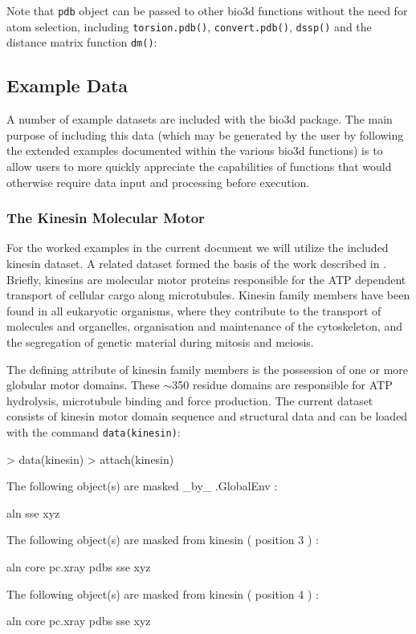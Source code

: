 \documentclass[a4paper]{article}
\begin{document}
Note that \texttt{pdb} object can be passed to other bio3d functions without the need for atom selection, including \texttt{torsion.pdb()}, \texttt{convert.pdb()}, \texttt{dssp()} and the distance matrix function \texttt{dm()}:

\subsection{Example Data}
A number of example datasets are included with the bio3d package. The main purpose of including this data (which may be generated by the user by following the extended examples documented within the various bio3d functions) is to allow users to more quickly appreciate the capabilities of functions that would otherwise require data input and processing before execution.


\subsubsection{The Kinesin Molecular Motor}
For the worked examples in the current document we will utilize the included kinesin dataset.  A related dataset formed the basis of the work described in \citep{grant07}.  Briefly, kinesins are molecular motor proteins responsible for the ATP dependent transport of cellular cargo along microtubules.  Kinesin family members have been found in all eukaryotic organisms, where they contribute to the transport of molecules and organelles, organisation and maintenance of the cytoskeleton, and the segregation of genetic material during mitosis and meiosis. 

The defining attribute of kinesin family members is the possession of one or more globular motor domains. These $\sim$350 residue domains are responsible for ATP hydrolysis, microtubule binding and force production. The current dataset consists of kinesin motor domain sequence and structural data and can be loaded with the command \texttt{data(kinesin)}:

\begin{Schunk}
\begin{Sinput}
> data(kinesin)
> attach(kinesin)
\end{Sinput}
\begin{Soutput}
	The following object(s) are masked _by_ .GlobalEnv :

	 aln sse xyz 


	The following object(s) are masked from kinesin ( position 3 ) :

	 aln core pc.xray pdbs sse xyz 


	The following object(s) are masked from kinesin ( position 4 ) :

	 aln core pc.xray pdbs sse xyz 
\end{Soutput}
\end{Schunk}
\end{document}
